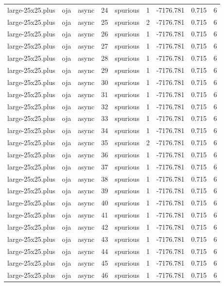 \begin{tabular}{lllrlrrrr}
large-25x25.plus & oja & async & 24 & spurious & 1 & -7176.781 & 0.715 & 6 \\
large-25x25.plus & oja & async & 25 & spurious & 2 & -7176.781 & 0.715 & 6 \\
large-25x25.plus & oja & async & 26 & spurious & 1 & -7176.781 & 0.715 & 6 \\
large-25x25.plus & oja & async & 27 & spurious & 1 & -7176.781 & 0.715 & 6 \\
large-25x25.plus & oja & async & 28 & spurious & 1 & -7176.781 & 0.715 & 6 \\
large-25x25.plus & oja & async & 29 & spurious & 1 & -7176.781 & 0.715 & 6 \\
large-25x25.plus & oja & async & 30 & spurious & 1 & -7176.781 & 0.715 & 6 \\
large-25x25.plus & oja & async & 31 & spurious & 1 & -7176.781 & 0.715 & 6 \\
large-25x25.plus & oja & async & 32 & spurious & 1 & -7176.781 & 0.715 & 6 \\
large-25x25.plus & oja & async & 33 & spurious & 1 & -7176.781 & 0.715 & 6 \\
large-25x25.plus & oja & async & 34 & spurious & 1 & -7176.781 & 0.715 & 6 \\
large-25x25.plus & oja & async & 35 & spurious & 2 & -7176.781 & 0.715 & 6 \\
large-25x25.plus & oja & async & 36 & spurious & 1 & -7176.781 & 0.715 & 6 \\
large-25x25.plus & oja & async & 37 & spurious & 1 & -7176.781 & 0.715 & 6 \\
large-25x25.plus & oja & async & 38 & spurious & 1 & -7176.781 & 0.715 & 6 \\
large-25x25.plus & oja & async & 39 & spurious & 1 & -7176.781 & 0.715 & 6 \\
large-25x25.plus & oja & async & 40 & spurious & 1 & -7176.781 & 0.715 & 6 \\
large-25x25.plus & oja & async & 41 & spurious & 1 & -7176.781 & 0.715 & 6 \\
large-25x25.plus & oja & async & 42 & spurious & 1 & -7176.781 & 0.715 & 6 \\
large-25x25.plus & oja & async & 43 & spurious & 1 & -7176.781 & 0.715 & 6 \\
large-25x25.plus & oja & async & 44 & spurious & 1 & -7176.781 & 0.715 & 6 \\
large-25x25.plus & oja & async & 45 & spurious & 1 & -7176.781 & 0.715 & 6 \\
large-25x25.plus & oja & async & 46 & spurious & 1 & -7176.781 & 0.715 & 6 \\

\end{tabular}
